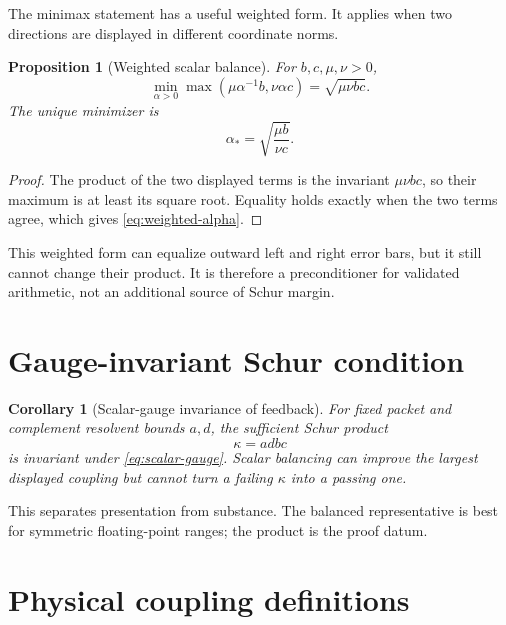 \documentclass[12pt]{article}
\newtheorem{proposition}[theorem]{Proposition}
\newtheorem{corollary}[theorem]{Corollary}
\theoremstyle{remark}
\begin{document}
The minimax statement has a useful weighted form.  It applies when two
directions are displayed in different coordinate norms.

\begin{proposition}[Weighted scalar balance]\label{prop:weighted-balance}
For $b,c,\mu,\nu>0$,
\begin{equation}\label{eq:weighted-minimax}
 \min_{\alpha>0}
 \max\!\left(\mu\alpha^{-1}b,\nu\alpha c\right)
 =\sqrt{\mu\nu bc}.
\end{equation}
The unique minimizer is
\begin{equation}\label{eq:weighted-alpha}
 \alpha_*=\sqrt{\frac{\mu b}{\nu c}}.
\end{equation}
\end{proposition}

\begin{proof}
The product of the two displayed terms is the invariant
$\mu\nu bc$, so their maximum is at least its square root.  Equality holds
exactly when the two terms agree, which gives
\eqref{eq:weighted-alpha}.
\end{proof}

This weighted form can equalize outward left and right error bars, but it
still cannot change their product.  It is therefore a preconditioner for
validated arithmetic, not an additional source of Schur margin.

\section{Gauge-invariant Schur condition}

\begin{corollary}[Scalar-gauge invariance of feedback]\label{cor:feedback}
For fixed packet and complement resolvent bounds $a,d$, the sufficient Schur
product
\begin{equation}\label{eq:invariant-feedback}
 \kappa=adbc
\end{equation}
is invariant under \eqref{eq:scalar-gauge}.  Scalar balancing can improve the
largest displayed coupling but cannot turn a failing $\kappa$ into a passing
one.
\end{corollary}

This separates presentation from substance.  The balanced representative is
best for symmetric floating-point ranges; the product is the proof datum.

\section{Physical coupling definitions}
\end{document}
